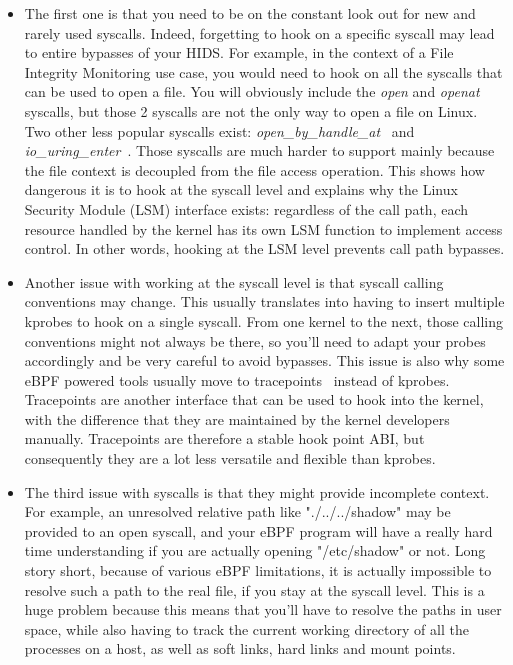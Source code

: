 \begin{itemize}
  \item The first one is that you need to be on the constant look out for new and rarely used syscalls.
  Indeed, forgetting to hook on a specific syscall may lead to entire bypasses of your HIDS.
  For example, in the context of a File Integrity Monitoring use case, you would need to hook on all the syscalls that can be used to open a file.
  You will obviously include the \emph{open} and \emph{openat} syscalls, but those 2 syscalls are not the only way to open a file on Linux.
  Two other less popular syscalls exist: \emph{open\_by\_handle\_at}~\cite{RuntimeSecurityMonitoringWithEBPF:OpenByHandleAt} and \emph{io\_uring\_enter}~\cite{RuntimeSecurityMonitoringWithEBPF:IOUring}.
  Those syscalls are much harder to support mainly because the file context is decoupled from the file access operation.
  This shows how dangerous it is to hook at the syscall level and explains why the Linux Security Module (LSM) interface exists: regardless of the call path, each resource handled by the kernel has its own LSM function to implement access control.
  In other words, hooking at the LSM level prevents call path bypasses.
  \item Another issue with working at the syscall level is that syscall calling conventions may change.
  This usually translates into having to insert multiple kprobes to hook on a single syscall.
  From one kernel to the next, those calling conventions might not always be there, so you’ll need to adapt your probes accordingly and be very careful to avoid bypasses.
  This issue is also why some eBPF powered tools usually move to tracepoints~\cite{RuntimeSecurityMonitoringWithEBPF:Tracepoints} instead of kprobes.
  Tracepoints are another interface that can be used to hook into the kernel, with the difference that they are maintained by the kernel developers manually.
  Tracepoints are therefore a stable hook point ABI, but consequently they are a lot less versatile and flexible than kprobes.
  \item The third issue with syscalls is that they might provide incomplete context.
  For example, an unresolved relative path like "./../../shadow" may be provided to an open syscall, and your eBPF program will have a really hard time understanding if you are actually opening "/etc/shadow" or not.
  Long story short, because of various eBPF limitations, it is actually impossible to resolve such a path to the real file, if you stay at the syscall level.
  This is a huge problem because this means that you’ll have to resolve the paths in user space, while also having to track the current working directory of all the processes on a host, as well as soft links, hard links and mount points.

\end{itemize}
